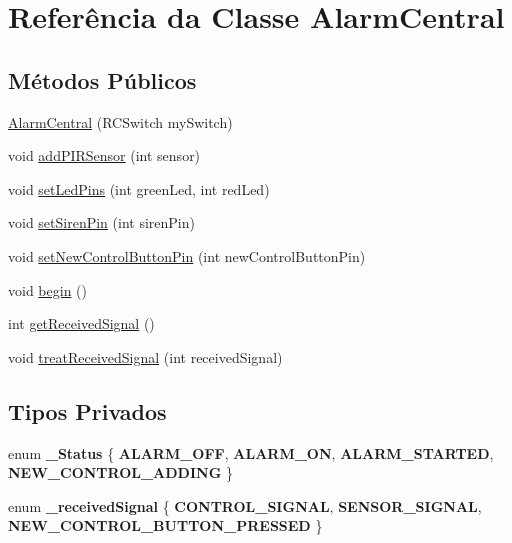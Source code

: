 \hypertarget{classAlarmCentral}{\section{Referência da Classe Alarm\+Central}
\label{classAlarmCentral}
}
\subsection*{Métodos Públicos}
\begin{DoxyCompactItemize}
\item 
\hyperlink{classAlarmCentral_a20cf0b433a5f7a745bad9fdceada83ed}{Alarm\+Central} (R\+C\+Switch my\+Switch)
\item 
void \hyperlink{classAlarmCentral_a309842cb51ffc4cf5c0b31d177accd8e}{add\+P\+I\+R\+Sensor} (int sensor)
\item 
void \hyperlink{classAlarmCentral_a1c8793e3ca800e7f5446fb20b5eed3f2}{set\+Led\+Pins} (int green\+Led, int red\+Led)
\item 
void \hyperlink{classAlarmCentral_a98cb7cc543581e2fad8257e3d200a7e4}{set\+Siren\+Pin} (int siren\+Pin)
\item 
void \hyperlink{classAlarmCentral_a996dc61f1e4908f7c61d52fc20cd3126}{set\+New\+Control\+Button\+Pin} (int new\+Control\+Button\+Pin)
\item 
void \hyperlink{classAlarmCentral_a28f388825ec7caeea038dcff3632b8b6}{begin} ()
\item 
int \hyperlink{classAlarmCentral_a687b130505b9500ac8e96a6b8b8eaf85}{get\+Received\+Signal} ()
\item 
void \hyperlink{classAlarmCentral_a0f7836737d8de5b39dc33d257f2bb88f}{treat\+Received\+Signal} (int received\+Signal)
\end{DoxyCompactItemize}
\subsection*{Tipos Privados}
\begin{DoxyCompactItemize}
\item 
\hypertarget{classAlarmCentral_a05d576dae5c6c13199e53aefee2520c4}{enum {\bfseries \+\_\+\+Status} \{ {\bfseries A\+L\+A\+R\+M\+\_\+\+O\+F\+F}, 
{\bfseries A\+L\+A\+R\+M\+\_\+\+O\+N}, 
{\bfseries A\+L\+A\+R\+M\+\_\+\+S\+T\+A\+R\+T\+E\+D}, 
{\bfseries N\+E\+W\+\_\+\+C\+O\+N\+T\+R\+O\+L\+\_\+\+A\+D\+D\+I\+N\+G}
 \}}\label{classAlarmCentral_a05d576dae5c6c13199e53aefee2520c4}

\item 
\hypertarget{classAlarmCentral_a8a169a9915dddbb4644643bc05780870}{enum {\bfseries \+\_\+received\+Signal} \{ {\bfseries C\+O\+N\+T\+R\+O\+L\+\_\+\+S\+I\+G\+N\+A\+L}, 
{\bfseries S\+E\+N\+S\+O\+R\+\_\+\+S\+I\+G\+N\+A\+L}, 
{\bfseries N\+E\+W\+\_\+\+C\+O\+N\+T\+R\+O\+L\+\_\+\+B\+U\+T\+T\+O\+N\+\_\+\+P\+R\+E\+S\+S\+E\+D}
 \}}\label{classAlarmCentral_a8a169a9915dddbb4644643bc05780870}

\end{DoxyCompactItemize}
